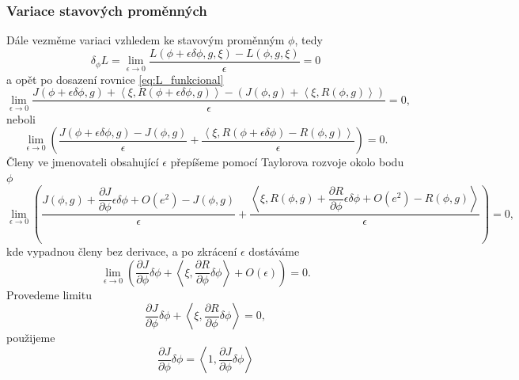 \subsubsection{Variace stavových proměnných}
Dále vezměme variaci vzhledem ke stavovým proměnným $ \phi $, tedy
\begin{equation*}
\delta_\phi L =
\lim\limits_{\epsilon\rightarrow0}
\dfrac{L(\phi+\epsilon\delta\phi,g,\xi)-L(\phi,g,\xi)}
{\epsilon}
=0
\end{equation*}
a opět po dosazení rovnice \ref{eq:L_funkcional}
\begin{equation*}
\lim\limits_{\epsilon\rightarrow0} \dfrac
{J(\phi+\epsilon\delta\phi, g) + 
 \left\langle\xi , R(\phi+\epsilon\delta\phi, g) \right\rangle -  (J(\phi, g) +  \left\langle\xi , R(\phi, g)\right\rangle)}
{\epsilon}
=0,
\end{equation*}
neboli
\begin{equation*}
\lim\limits_{\epsilon\rightarrow 0} 
\left(
\dfrac
{J(\phi+\epsilon\delta\phi, g) - J(\phi, g)}
{\epsilon}
+
\dfrac
{  \left\langle\xi , R(\phi+\epsilon\delta\phi) - R(\phi, g)\right\rangle }
{\epsilon}
\right)
=0.
\end{equation*}
Členy ve jmenovateli obsahující $ \epsilon $ přepíšeme pomocí Taylorova rozvoje okolo bodu $ \phi $
\begin{equation*}
\lim\limits_{\epsilon\rightarrow 0} 
\left(
\dfrac
{J(\phi, g) + \dfrac{\partial J}{\partial \phi}\epsilon\delta\phi + O(e^2) - J(\phi, g)}
{\epsilon}
+
\dfrac
{  \left\langle\xi , R(\phi,g) + \dfrac{\partial R}{\partial \phi} \epsilon \delta\phi + O(e^2) - R(\phi,g)\right\rangle }
{\epsilon}
\right)
=0,
\end{equation*}
kde vypadnou členy bez derivace, a po zkrácení $ \epsilon $ dostáváme
\begin{equation*}
\lim\limits_{\epsilon\rightarrow 0} 
\left(
\dfrac{\partial J}{\partial \phi}\delta\phi
+  \left\langle\xi , \dfrac{\partial R}{\partial \phi} \delta\phi \right\rangle
+O(\epsilon)
\right)
=0.
\end{equation*}
Provedeme limitu 
\begin{equation}\label{eq:sdruzene_rce_variace}
\frac{\partial J}{\partial \phi}\delta\phi
+  \left\langle\xi , \dfrac{\partial R}{\partial \phi} \delta\phi\right\rangle
=0,
\end{equation}
použijeme 
\begin{equation*}
\frac{\partial J}{\partial \phi}\delta\phi = \left\langle 1, \frac{\partial J}{\partial \phi}\delta\phi \right\rangle
\end{equation*}

